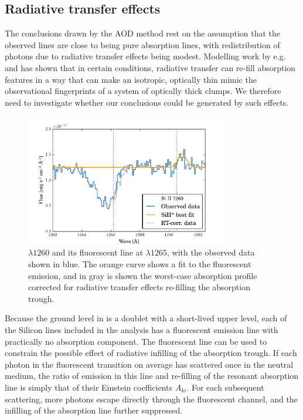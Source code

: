 \documentclass[twocolumn]{aastex61}
\begin{document}
\subsection{Radiative transfer effects}\label{sec:rt}

The conclusions drawn by the AOD method rest on the assumption that the
observed lines are close to being pure absorption lines, with
redistribution of photons due to radiative transfer effects being
modest. Modelling work by e.g. \citet{Prochaska2011} and
\citet{Scarlata2015} has shown that in certain conditions, radiative
transfer can re-fill absorption features in a way that can make an
isotropic, optically thin mimic the observational fingerprints of a
system of optically thick clumps. We therefore need to investigate
whether our conclusions could be generated by such effects.

\begin{figure}
\centering
\includegraphics[width=3.500in]{./1260-fit-fluor.pdf}
\caption{ $\lambda 1260$ and its fluorescent line at
$\lambda 1265$, with the observed data shown in blue. The orange curve
shows a fit to the fluorescent emission, and in gray is shown the
worst-case absorption profile corrected for radiative transfer effects
re-filling the absorption trough.}\label{fig:rt}
\end{figure}

Because the ground level in  is a doublet with a short-lived
upper level, each of the Silicon lines included in the analysis has a
fluorescent emission line with practically no absorption component. The
fluorescent line can be used to constrain the possible effect of
radiative infilling of the absorption trough. If each photon in the
fluorescent transition on average has scattered once in the neutral
medium, the ratio of emission in this line and re-filling of the
resonant absorption line is simply that of their Einstein coefficients
$A_{ki}$. For each subsequent scattering, more photons escape directly
through the fluorescent channel, and the infilling of the absorption
line further suppressed.
\end{document}
